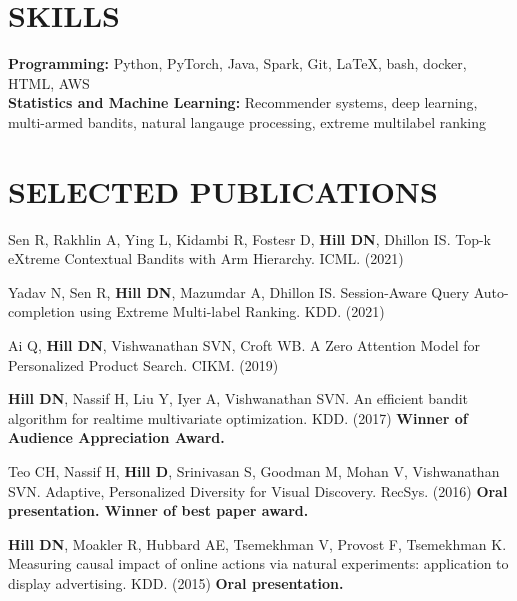 \documentclass[line,10pt]{res}
\begin{document}
\begin{resume}
\section{SKILLS} 
{\bf Programming:} Python, PyTorch, Java, Spark, Git, \LaTeX, bash, docker, HTML, AWS \\
{\bf Statistics and Machine Learning: } Recommender systems, deep learning, multi-armed bandits, natural langauge processing, extreme multilabel ranking
    
\section{SELECTED PUBLICATIONS} 

Sen R, Rakhlin A, Ying L, Kidambi R, Fostesr D, \textbf{Hill DN}, Dhillon IS. Top-k eXtreme Contextual Bandits with Arm Hierarchy.  ICML. (2021)

Yadav N, Sen R, \textbf{Hill DN}, Mazumdar A, Dhillon IS. Session-Aware Query Auto-completion using Extreme Multi-label Ranking.  KDD. (2021)

Ai Q, \textbf{Hill DN}, Vishwanathan SVN, Croft WB. A Zero Attention Model for Personalized Product Search. CIKM. (2019)

\textbf{Hill DN}, Nassif H, Liu Y, Iyer A, Vishwanathan SVN. An efficient bandit algorithm for realtime multivariate optimization. KDD. (2017) \textbf{Winner of Audience Appreciation Award.}

Teo CH, Nassif H, \textbf{Hill D}, Srinivasan S, Goodman M, Mohan V, Vishwanathan SVN. Adaptive, Personalized Diversity for Visual Discovery. RecSys. (2016) \textbf{Oral presentation. Winner of best paper award.}

\textbf{Hill DN}, Moakler R, Hubbard AE, Tsemekhman V, Provost F, Tsemekhman K.  Measuring causal impact of online actions via natural experiments: application to display advertising. KDD. (2015) \textbf{Oral presentation.}

\end{resume}
\end{document}

